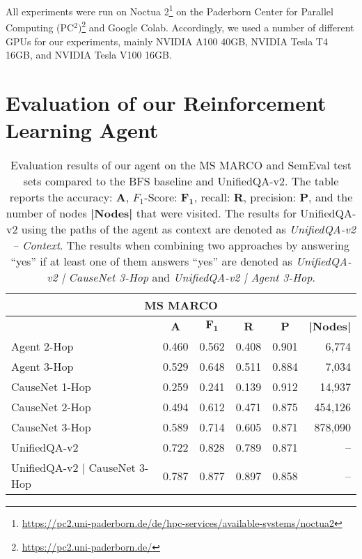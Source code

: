 All experiments were run on Noctua 2\footnote{\url{https://pc2.uni-paderborn.de/de/hpc-services/available-systems/noctua2}} on the Paderborn 
Center for Parallel Computing (PC$^2)$\footnote{\url{https://pc2.uni-paderborn.de/}} and Google Colab.
Accordingly, we used a number of different GPUs for our experiments, mainly  NVIDIA A100 
40GB, NVIDIA Tesla T4 16GB, and NVIDIA Tesla V100 16GB.


\section{Evaluation of our Reinforcement Learning Agent}
\label{sec:evaluation-approach}


\renewcommand{\tabcolsep}{6pt}
\begin{table}
\centering
\caption{Evaluation results of our agent on the MS MARCO and SemEval test sets compared to the BFS baseline and UnifiedQA-v2. The table reports the 
		accuracy: \textbf{A}, $F_1$-Score: $\mathbf{F_1}$, recall: \textbf{R}, precision: \textbf{P}, and the number of nodes \textbf{|Nodes|} that were visited.
		The results for UnifiedQA-v2 using the paths of the agent as context are denoted as \textit{UnifiedQA-v2 -- Context}. The results when combining two approaches by answering ``yes'' if at least one of them answers ``yes'' are denoted as \textit{UnifiedQA-v2 | CauseNet 3-Hop} and \textit{UnifiedQA-v2 | Agent 3-Hop}.
		}
\label{table-evaluation-msmarco}
\begin{tabular}{lccccr} 
			\toprule
			\multicolumn{6}{c}{\textbf{MS MARCO}}\\
			\midrule
			& \textbf{A} & \textbf{$\mathbf{F_1}$} & \textbf{R} & \textbf{P} & \textbf{|Nodes|}\\
			\midrule
			Agent 2-Hop & 0.460 & 0.562 & 0.408 & 0.901 & 6,774\\
			Agent 3-Hop & 0.529 & 0.648 & 0.511 & 0.884 & 7,034 \\
			\midrule
			CauseNet 1-Hop & 0.259 & 0.241 & 0.139 & 0.912 & 14,937 \\ 
			CauseNet 2-Hop & 0.494 & 0.612 & 0.471 & 0.875 & 454,126 \\ 
			CauseNet 3-Hop & 0.589 & 0.714 & 0.605 & 0.871 & 878,090\\ 
			\midrule
			UnifiedQA-v2 & 0.722 & 0.828 & 0.789 & 0.871 & -- \\
			UnifiedQA-v2 | CauseNet 3-Hop & 0.787 & 0.877 & 0.897 & 0.858 & --  \\

\end{tabular}
\end{table}
